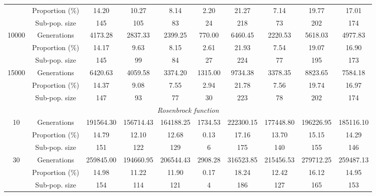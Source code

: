 \documentclass[final,1p,times]{elsarticle}
\begin{document}
\begin{table}
{{\begin{tabular}{|c|c|c|c|c|c|c|c|c|c|}
                     & Proportion  (\%)  &  14.20  &   10.27  &   8.14   &   2.20   &   21.27   &  7.14  &    19.77  &   17.01          \\ \cline{2-10}
                     & Sub-pop. size &  145  & 105  & 83 &   24  &  218 &  73  &  202  & 174         \\ \hline    
\multirow{3}{*}{10000} & Generations &  4173.28 &  2837.33  & 2399.25  & 770.00  &  6460.45  & 2220.53  & 5618.03 &  4977.83         \\ \cline{2-10}
                     & Proportion  (\%)  &  14.17  &   9.63   &   8.15    &  2.61  &    21.93    & 7.54  &    19.07  &   16.90          \\ \cline{2-10}
                     & Sub-pop. size &   145    &  99  &  84  &  27  &  224  & 77 &   195  & 173          \\ \hline    
\multirow{3}{*}{15000} & Generations &   6420.63  &    4059.58  & 3374.20  & 1315.00  & 9734.38  & 3378.35  & 8823.65  & 7584.18       \\ \cline{2-10}
                     & Proportion  (\%)  &   14.37  &  9.08   &   7.55   &   2.94   &   21.78   &  7.56   &   19.74   &  16.97    \\ \cline{2-10}
                     & Sub-pop. size &   147   &   93  &  77  &  30  &  223  & 78  &  202 &  174           \\ \hline    
\multicolumn{10}{|c|}{{\em Rosenbrock function}} \\ \hline
\multirow{3}{*}{10} & Generations    &  191564.30   &  156714.43  &   164188.25   &  1734.53  & 222300.15  &   177448.80  &   196226.95  &   185116.10          \\ \cline{2-10}
                     & Proportion (\%)   &  14.79   &  12.10   &  12.68   &  0.13   &   17.16   &  13.70  &   15.15  &   14.29       \\ \cline{2-10}
                     & Sub-pop. size &  151  & 122 &  129  & 6  &   175 &  140  & 155  & 146         \\ \hline    
\multirow{3}{*}{30} & Generations    &  259845.00   &  194660.95   &  206544.43  &   2908.28 &  316523.85   &  215456.53   &  279712.25   &  259487.13          \\ \cline{2-10}
                     & Proportion (\%)   &  14.98  	&   11.22  &   11.90  &   0.17   &   18.24  &  12.42  &   16.12   &  14.95    \\ \cline{2-10}
                     & Sub-pop. size &  154 	&  114  & 121 &  4  &   186 &  127  & 165  & 153      \\ \hline    

\end{tabular}}}
\end{table}
\end{document}
